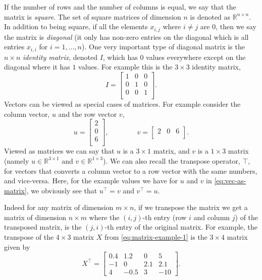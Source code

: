 \documentclass[12pt]{article}
\begin{document}
If the number of rows and the number of columns is equal, we say that the matrix is {\em square}. The set of square matrices of dimension $n$ is denoted as ${\mathbb R}^{n \times n}$. In addition to being square, if all the elements $x_{i,j}$ where $i \neq j$ are $0$, then we say the matrix is {\em diagonal} (it only has non-zero entries on the diagonal which is all entries $x_{i,i}$ for $i=1,\ldots,n$). One very important type of diagonal matrix is the $n \times n$ {\em identity matrix}, denoted $I$, which has $0$ values everywhere except on the diagonal where it has $1$ values. For example this is the $3 \times 3$ identity matrix,
%
\begin{equation}
\label{eq:identity}
I
=
\begin{bmatrix}
    1 & 0 & 0\\
    0 & 1 & 0 \\
    0 & 0 & 1 \\
 \end{bmatrix}.
\end{equation}
%
Vectors can be viewed as special cases of matrices. For example consider the column vector, $u$ and the row vector $v$,
\begin{equation}
\label{eq:vec-as-matrix}
u = 
\begin{bmatrix}
2 \\
0 \\
6 \\
\end{bmatrix},
\qquad \qquad
v = 
\begin{bmatrix}
2 & 0 & 6\\
\end{bmatrix}.
\end{equation}
%
Viewed as matrices we can say that $u$ is a $3 \times 1$ matrix, and $v$ is a $1 \times 3$ matrix (namely $u \in {\mathbb R}^{3 \times 1}$ and $v \in {\mathbb R}^{1 \times 3}$). We can also recall the transpose operator, $\top$, for vectors that converts a column vector to a row vector with the same numbers, and vice-versa. Here, for the example values we have for $u$ and $v$ in \eqref{eq:vec-as-matrix}, we obviously see that $u^\top = v$ and $v^\top = u$.

Indeed for any matrix of dimension $m \times n$, if we transpose the matrix we get a matrix of dimension $n \times m$ where the $(i,j)$-th entry (row $i$ and column $j$) of the transposed matrix, is the $(j,i)$-th entry of the original matrix. For example, the transpose of the $4 \times 3$ matrix $X$ from \eqref{eq:matrix-example-1} is the $3 \times 4$ matrix given by
%
\begin{equation}
\label{eq:matrix-example-1-t}
X^\top =
\begin{bmatrix}
    0.4 & 1.2 & 0 & 5 \\
    -1 & 0 & 2.1 & 2.1 \\
    4 & -0.5 & 3 & -10
\end{bmatrix}.
\end{equation}
%
\end{document}
